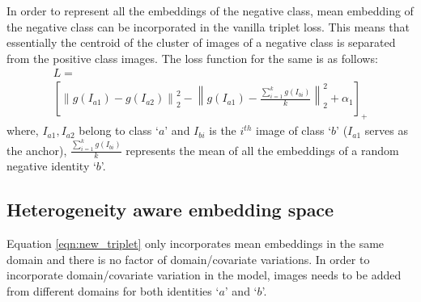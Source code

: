 \documentclass[10pt,twocolumn,letterpaper]{article}
\begin{document}


In order to represent all the embeddings of the negative class, mean embedding of the negative class can be incorporated in the vanilla triplet loss. This means that essentially the centroid of the cluster of images of a negative class is separated from the positive class images. The loss function for the same is as follows:
\vspace{-5pt}
\begin{multline}
  \label{eqn:new_triplet}
  L = \\
  \left [\left \| g(I_{a1}) - g(I_{a2}) \right \|^2_2 - \left \| g(I_{a1}) - \frac{\sum_{i=1}^kg(I_{bi})}{k} \right \|^2_2   + \alpha_1 \right]_+
\end{multline}
where, $I_{a1}, I_{a2}$ belong to class `$a$' and $I_{bi}$ is the $i^{th}$ image of class `$b$' ($I_{a1}$ serves as the anchor),  $\frac{\sum_{i=1}^kg(I_{bi})}{k}$ represents the mean of all the embeddings of a random negative identity `$b$'.

\subsection{Heterogeneity aware embedding space}
Equation \ref{eqn:new_triplet} only incorporates mean embeddings in the same domain and there is no factor of domain/covariate variations. In order to incorporate domain/covariate variation in the model, images needs to be added from different domains for both identities `$a$' and `$b$'. 
\end{document}
